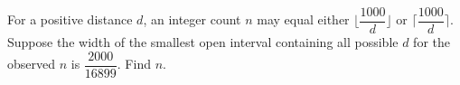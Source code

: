 For a positive distance $d$, an integer count $n$ may equal either $\lfloor\dfrac{1000}{d}\rfloor$ or $\lceil\dfrac{1000}{d}\rceil$. Suppose the width of the smallest open interval containing all possible $d$ for the observed $n$ is $\dfrac{2000}{16899}$. Find $n$.
